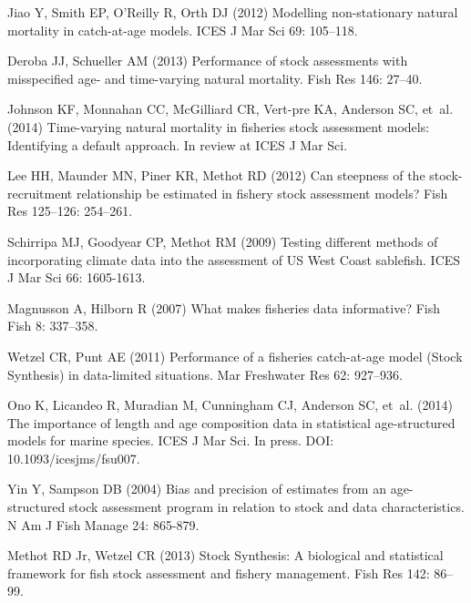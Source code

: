 \documentclass[10pt]{article}
\begin{document}
\begin{thebibliography}{10}
Jiao Y, Smith EP, O'Reilly R, Orth DJ (2012) Modelling non-stationary natural
  mortality in catch-at-age models.
\newblock ICES J Mar Sci 69: 105--118.

Deroba JJ, Schueller AM (2013) Performance of stock assessments with
  misspecified age- and time-varying natural mortality.
\newblock Fish Res 146: 27--40.

Johnson KF, Monnahan CC, McGilliard CR, Vert-pre KA, Anderson SC, et~al. (2014)
  Time-varying natural mortality in fisheries stock assessment models:
  Identifying a default approach.
\newblock In review at ICES J Mar Sci.

Lee HH, Maunder MN, Piner KR, Methot RD (2012) Can steepness of the
  stock-recruitment relationship be estimated in fishery stock assessment
  models?
\newblock Fish Res 125--126: 254--261.

Schirripa MJ, Goodyear CP, Methot RM (2009) Testing different methods of
  incorporating climate data into the assessment of {US West Coast} sablefish.
\newblock ICES J Mar Sci 66: 1605-1613.

Magnusson A, Hilborn R (2007) What makes fisheries data informative?
\newblock Fish Fish 8: 337--358.

Wetzel CR, Punt AE (2011) Performance of a fisheries catch-at-age model ({Stock
  Synthesis}) in data-limited situations.
\newblock Mar Freshwater Res 62: 927--936.

Ono K, Licandeo R, Muradian M, Cunningham CJ, Anderson SC, et~al. (2014) The
  importance of length and age composition data in statistical age-structured
  models for marine species.
\newblock ICES J Mar Sci. In press. DOI: 10.1093/icesjms/fsu007.

Yin Y, Sampson DB (2004) Bias and precision of estimates from an age-structured
  stock assessment program in relation to stock and data characteristics.
\newblock N Am J Fish Manage 24: 865-879.

Methot RD Jr, Wetzel CR (2013) {Stock Synthesis}: A biological and statistical
  framework for fish stock assessment and fishery management.
\newblock Fish Res 142: 86--99.


\end{thebibliography}
\end{document}
